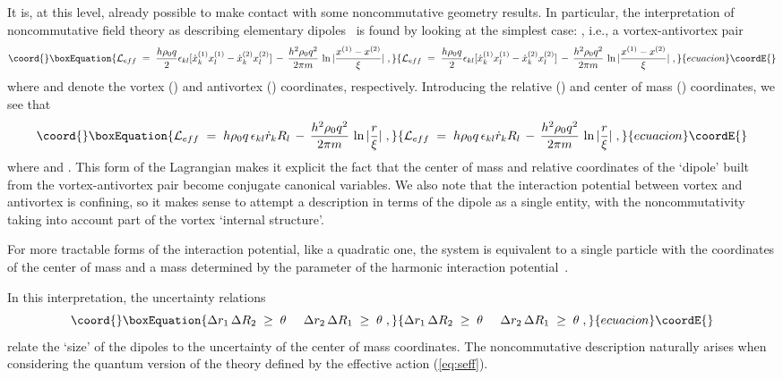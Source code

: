 \documentclass[a4paper,12pt]{article} \tolerance=200
\begin{document}
It is, at this level, already possible to make contact with some
noncommutative geometry results. In particular, the interpretation of
noncommutative field theory as describing elementary dipoles~\cite{BS}
is found by looking at the simplest case: \coordHE{}, i.e., a 
vortex-antivortex pair
\begin{equation}\coord{}\boxEquation{\label{eq:fq2}
{\mathcal L}_{eff}\;=\; \frac{h \rho_0 q}{2} \epsilon_{kl}
[\dot{x}^{(1)}_k x^{(1)}_l - \dot{x}^{(2)}_k x^{(2)}_l]
\,-\,\frac{h^2\rho_0 q^2}{2\pi m}\, 
\ln | \frac{x^{(1)} - x^{(2)}}{\xi} | \;,
}{{\mathcal L}_{eff}\;=\; \frac{h \rho_0 q}{2} \epsilon_{kl}
[\dot{x}^{(1)}_k x^{(1)}_l - \dot{x}^{(2)}_k x^{(2)}_l]
\,-\,\frac{h^2\rho_0 q^2}{2\pi m}\, 
\ln | \frac{x^{(1)} - x^{(2)}}{\xi} | \;,
}{ecuacion}\coordE{}\end{equation}
where \coordHE{} and \coordHE{} denote the vortex (\coordHE{}) and
antivortex (\coordHE{}) coordinates, respectively. Introducing the
relative (\coordHE{}) and center of mass (\coordHE{}) coordinates, we see that
\begin{equation}\coord{}\boxEquation{
{\mathcal L}_{eff}\;=\; h \rho_0 q \, \epsilon_{kl} \dot{r}_k R_l
\,-\,\frac{h^2\rho_0 q^2}{2\pi m}\, \ln |\frac{r}{\xi}| \;,
}{
{\mathcal L}_{eff}\;=\; h \rho_0 q \, \epsilon_{kl} \dot{r}_k R_l
\,-\,\frac{h^2\rho_0 q^2}{2\pi m}\, \ln |\frac{r}{\xi}| \;,
}{ecuacion}\coordE{}\end{equation}
where \coordHE{} and \coordHE{}.  This form of the Lagrangian makes it explicit the
fact that the center of mass and relative coordinates of the `dipole'
built from the vortex-antivortex pair become conjugate canonical
variables. We also note that the interaction potential between vortex 
and antivortex is confining, so it makes sense to attempt a description
in terms of the dipole as a single entity, with the noncommutativity 
taking into account part of the vortex `internal structure'.

For more tractable forms of the interaction potential, like
a quadratic one, the system is equivalent to a single particle with
the coordinates of the center of mass \coordHE{} and a mass determined by
the parameter of the harmonic interaction potential~\cite{BS}.

In this interpretation, the uncertainty relations
\begin{equation}\coord{}\boxEquation{\label{eq:uncert}
\Delta r_1 \, \Delta R_2 \;\geq\; \theta \;\;\;\;\; \Delta r_2 \, \Delta R_1 \;\geq\; \theta \;,
}{\Delta r_1 \, \Delta R_2 \;\geq\; \theta \;\;\;\;\; \Delta r_2 \, \Delta R_1 \;\geq\; \theta \;,
}{ecuacion}\coordE{}\end{equation}
relate the `size' of the dipoles to the uncertainty of the center of
mass coordinates.  The noncommutative description naturally arises
when considering the quantum version of the theory defined by the
effective action (\ref{eq:seff}). 
\end{document}

